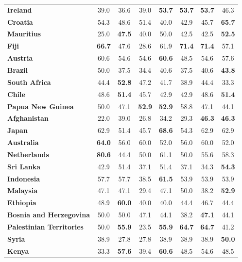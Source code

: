 \begin{table}
{\begin{tabular}{lccccccc}
    \textbf{Ireland} & 39.0 & 36.6 & 39.0 & \textbf{53.7} & \textbf{53.7} & \textbf{53.7} & 46.3 \\
    \textbf{Croatia} & 54.3 & 48.6 & 51.4 & 40.0 & 42.9 & 45.7 & \textbf{65.7} \\
    \textbf{Mauritius} & 25.0 & \textbf{47.5} & 40.0 & 50.0 & 42.5 & 42.5 & \textbf{52.5} \\
    \textbf{Fiji} & \textbf{66.7} & 47.6 & 28.6 & 61.9 & \textbf{71.4} & \textbf{71.4} & 57.1 \\
    \textbf{Austria} & 60.6 & 54.6 & 54.6 & \textbf{60.6} & 48.5 & 54.6 & 57.6 \\
    \textbf{Brazil} & 50.0 & 37.5 & 34.4 & 40.6 & 37.5 & 40.6 & \textbf{43.8} \\
    \textbf{South Africa} & 44.4 & \textbf{52.8} & 47.2 & 41.7 & 38.9 & 44.4 & 33.3 \\
    \textbf{Chile} & 48.6 & \textbf{51.4} & 45.7 & 42.9 & 42.9 & 48.6 & \textbf{51.4} \\
    \textbf{Papua New Guinea} & 50.0 & 47.1 & \textbf{52.9} & \textbf{52.9} & 58.8 & 47.1 & 44.1 \\
    \textbf{Afghanistan} & 22.0 & 39.0 & 26.8 & 34.2 & 29.3 & \textbf{46.3} & \textbf{46.3} \\
    \textbf{Japan} & 62.9 & 51.4 & 45.7 & \textbf{68.6} & 54.3 & 62.9 & 62.9 \\
    \textbf{Australia} & \textbf{64.0} & 56.0 & 60.0 & 52.0 & 56.0 & 60.0 & 52.0 \\
    \textbf{Netherlands} & \textbf{80.6} & 44.4 & 50.0 & 61.1 & 50.0 & 55.6 & 58.3 \\
    \textbf{Sri Lanka} & 42.9 & 51.4 & 37.1 & 51.4 & 37.1 & 34.3 & \textbf{54.3} \\
    \textbf{Indonesia} & 57.7 & 57.7 & 38.5 & \textbf{61.5} & 53.9 & 53.9 & 53.9 \\
    \textbf{Malaysia} & 47.1 & 47.1 & 29.4 & 47.1 & 50.0 & 38.2 & \textbf{52.9} \\
    \textbf{Ethiopia} & 48.9 & \textbf{60.0} & 40.0 & 40.0 & 44.4 & 46.7 & 44.4 \\
    \textbf{Bosnia and Herzegovina} & 50.0 & 50.0 & 47.1 & 44.1 & 38.2 & \textbf{47.1} & 44.1 \\
    \textbf{Palestinian Territories} & 50.0 & \textbf{55.9} & 23.5 & \textbf{55.9} & \textbf{64.7} & \textbf{64.7} & 41.2 \\
    \textbf{Syria} & 38.9 & 27.8 & 27.8 & 38.9 & 38.9 & 38.9 & \textbf{50.0} \\
    \textbf{Kenya} & 33.3 & \textbf{57.6} & 39.4 & \textbf{60.6} & 48.5 & 54.6 & 48.5 \\

\end{tabular}}
\end{table}
